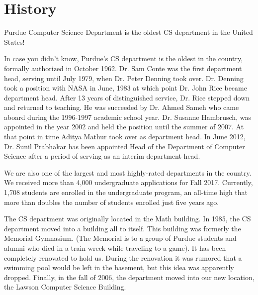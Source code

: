 \section{History}

\begin{tcolorbox}[colback=green!5!white,colframe=green!75!black]
	Purdue Computer Science Department is the oldest CS department in the United States!
\end{tcolorbox}

In case you didn't know, Purdue's CS department is the oldest in the country, formally authorized in October 1962. Dr. Sam Conte was the first department head, serving until July 1979, when Dr. Peter Denning took over. Dr. Denning took a position with NASA in June, 1983 at which point Dr. John Rice became department head. After 13 years of distinguished service, Dr. Rice stepped down and returned to teaching. He was succeeded by Dr. Ahmed Sameh who came aboard during the 1996-1997 academic school year. Dr. Susanne Hambrusch, was appointed in the year 2002 and held the position until the summer of 2007. At that point in time Aditya Mathur took over as department head. In June 2012, Dr. Sunil Prabhakar has been appointed Head of the Department of Computer Science after a period of serving as an interim department head.

We are also one of the largest and most highly-rated departments in the country. We received more than 4,000 undergraduate applications for Fall 2017. Currently, 1,708 students are enrolled in the undergraduate program, an all-time high that more than doubles the number of students enrolled just five years ago.

The CS department was originally located in the Math building. In 1985, the CS department moved into a building all to itself. This building was formerly the Memorial Gymnasium. (The Memorial is to a group of Purdue students and alumni who died in a train wreck while traveling to a game). It has been completely renovated to hold us. During the renovation it was rumored that a swimming pool would be left in the basement, but this idea was apparently dropped. Finally, in the fall of 2006, the department moved into our new location, the Lawson Computer Science Building.
